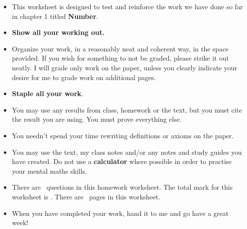\documentclass[10pt]{exam}
\begin{document}
\begin{minipage}[t]{3.7in}
\vspace{0pt}
\begin{itemize}
\item
This worksheet is designed to test and reinforce the work we have done so far in chapter 1 titled \textbf{Number}.

\item \textbf{Show all your working out.}

\item Organize your work, in a reasonably neat and coherent way, in
the space provided. If you wish for something to not be graded, please strike it out neatly. I will grade only work on the paper, unless you clearly indicate your desire for me to grade work on additional pages.

\item \textbf{Staple all your work}.

\item You may use any results from class, homework or the text, but you must cite the result you are using. You must prove everything else.

\item You needn't spend your time rewriting definitions or axioms on the paper.

\item 
You may use the text, my class notes and/or any notes and study guides you have created.
Do not use a \textbf{calculator} where possible in order to practise your mental maths skills.

\item
There are \numquestions\ questions in this homework worksheet. The total mark for this worksheet is \numpoints.
There are \numpages\ pages in this worksheet. 

\item When you have completed your work, hand it to me and go have a great week!


\end{itemize}


\end{minipage}
\hfill
\begin{minipage}[t]{2.3in}
\vspace{0pt}
\addpoints %
\gradetable[v][questions]  %

\end{minipage}
\end{document}
